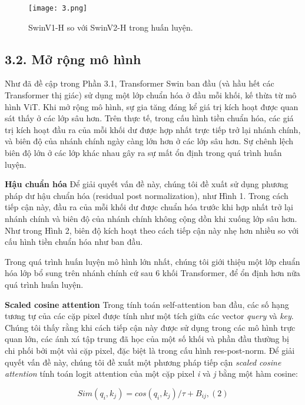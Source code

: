 \documentclass[times, twocolumn]{zHenriquesLab-StyleBioRxiv}
\begin{document}
\begin{figure}[!ht] %
    \centering
    \texttt{[image: 3.png]}
    \caption{SwinV1-H so với SwinV2-H trong huấn luyện.}
\end{figure}

\subsection*{3.2. Mở rộng mô hình}
Như đã đề cập trong Phần 3.1, Transformer Swin ban đầu (và hầu hết các Transformer thị giác) sử dụng một lớp chuẩn hóa ở đầu mỗi khối, kế thừa từ mô hình ViT. Khi mở rộng mô hình, sự gia tăng đáng kể giá trị kích hoạt được quan sát thấy ở các lớp sâu hơn. Trên thực tế, trong cấu hình tiền chuẩn hóa, các giá trị kích hoạt đầu ra của mỗi khối dư được hợp nhất trực tiếp trở lại nhánh chính, và biên độ của nhánh chính ngày càng lớn hơn ở các lớp sâu hơn. Sự chênh lệch biên độ lớn ở các lớp khác nhau gây ra sự mất ổn định trong quá trình huấn luyện.

\vspace*{5mm}
\textbf{Hậu chuẩn hóa} Để giải quyết vấn đề này, chúng tôi đề xuất sử dụng phương pháp dư hậu chuẩn hóa (residual post normalization), như Hình 1. Trong cách tiếp cận này, đầu ra của mỗi khối dư được chuẩn hóa trước khi hợp nhất trở lại nhánh chính và biên độ của nhánh chính không cộng dồn khi xuống lớp sâu hơn. Như trong Hình 2, biên độ kích hoạt theo cách tiếp cận này nhẹ hơn nhiều so với cấu hình tiền chuẩn hóa như ban đầu.

Trong quá trình huấn luyện mô hình lớn nhất, chúng tôi giới thiệu một lớp chuẩn hóa lớp bổ sung trên nhánh chính cứ sau $6$ khối Transformer, để ổn định hơn nữa quá trình huấn luyện.

\vspace*{5mm}
\textbf{Scaled cosine attention} Trong tính toán self-attention ban đầu, các số hạng tương tự của các cặp pixel được tính như một tích giữa các vector \textit{query} và \textit{key}. Chúng tôi thấy rằng khi cách tiếp cận này được sử dụng trong các mô hình trực quan lớn, các ánh xá tập trung đã học của một số khối và phần đầu thường bị chi phối bởi một vài cặp pixel, đặc biệt là trong cấu hình res-post-norm. Để giải quyết vấn đề này, chúng tôi đề xuất một phương pháp tiếp cận \textit{scaled cosine attention} tính toán logit attention của một cặp pixel \textit{i} và \textit{j} bằng một hàm cosine:

$$Sim(q_{i}, k_{j}) = cos(q_{i}, k_{j})/\tau + B_{ij}, (2)$$
\end{document}
